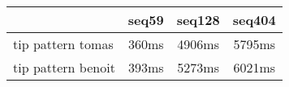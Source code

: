 \begin{tabular}{|l|c|c|c|}
\hline
 & seq59 & seq128 & seq404  \\
\hline
tip pattern tomas &  360ms &  4906ms &  5795ms\\
\hline
tip pattern benoit &  393ms &  5273ms &  6021ms\\
\hline
\end{tabular}
